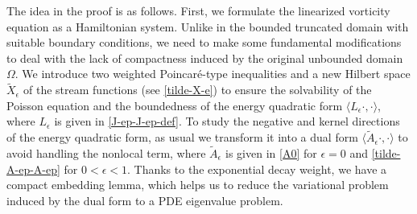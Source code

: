 \documentclass[1 [leqno, 11pt]{amsart}
\numberwithin{equation}{section}
\let\ep=\epsilon
\begin{document}
\begin{CJK*}{GBK}{song}
The idea in the proof is as follows.
First, we formulate the linearized vorticity equation  as a Hamiltonian system. Unlike in the bounded truncated  domain with suitable boundary conditions,  we need to  make some fundamental  modifications to  deal with  the lack of compactness
induced by the original unbounded domain $\Omega$. We introduce two weighted  Poincar\'e-type inequalities  and a new Hilbert space $\tilde X_\ep$ of the stream functions (see \eqref{tilde-X-e}) to ensure the solvability of the Poisson equation and the boundedness of the energy quadratic form $\langle L_\epsilon\cdot,\cdot\rangle$, where $L_\epsilon$ is given in \eqref{J-ep-J-ep-def}. To study the negative and kernel directions of the energy quadratic form, as usual we transform it into a dual form $\langle\tilde A_\epsilon\cdot,\cdot\rangle$
 to avoid handling the nonlocal term, where $\tilde A_\epsilon$ is given in \eqref{A0} for $\ep=0$ and \eqref{tilde-A-ep-A-ep} for $0<\ep<1$.  Thanks to the exponential decay weight, we have a compact embedding lemma, which helps us to reduce the variational problem induced by the dual form to a PDE eigenvalue problem.


\end{CJK*}
\end{document}
